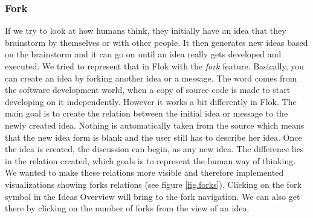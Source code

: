 \documentclass[a4paper,12pt, oneside]{article}
\begin{document}
\subsubsection{Fork}
\label{sec.fork}
If we try to look at how humans think, they initially have an idea that they brainstorm by themselves or with other people.
It then generates new ideas based on the brainstorm and it can go on until an idea really gets developed and executed.
We tried to represent that in Flok with the \emph{fork} feature.
Basically, you can create an idea by forking another idea or a message.
The word comes from the software development world, when a copy of source code is made to start developing on it independently.
However it works a bit differently in Flok.
The main goal is to create the relation between the initial idea or message to the newly created idea.
Nothing is automatically taken from the source which means that the new idea form is blank and the user still has to describe her idea.
Once the idea is created, the discussion can begin, as any new idea.
The difference lies in the relation created, which goals is to represent the human way of thinking.
We wanted to make these relations more visible and therefore implemented visualizations showing forks relations (see figure \ref{fig.forks}).
Clicking on the fork symbol in the Ideas Overview will bring to the fork navigation.
We can also get there by clicking on the number of forks from the view of an idea.
\end{document}

